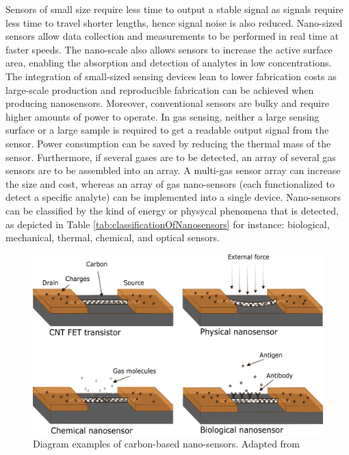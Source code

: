 Sensors of small size require less time to output a stable signal as signals require less time to travel shorter lengths, hence signal noise is also reduced. Nano-sized sensors allow data collection and measurements to be performed in real time at faster speeds. \cite{Khanna2016} The nano-scale also allows sensors to increase the active surface area, enabling the absorption and detection of analytes in low concentrations. \cite{Khanna2016} The integration of small-sized sensing devices lean to lower fabrication costs as large-scale production and reproducible fabrication can be achieved when producing nanosensors. \cite{Khanna2016} Moreover, conventional sensors are bulky and require higher amounts of power to operate. In gas sensing, neither a large sensing surface or a large sample is required to get a readable output signal from the sensor. Power consumption can be saved by reducing the thermal mass of the sensor. \cite{Khanna2016} Furthermore, if several gases are to be detected, an array of several gas sensors are to be assembled into an array. A multi-gas sensor array can increase the size and cost, whereas an array of gas nano-sensors (each functionalized to detect a specific analyte) can be implemented into a single device. \cite{Khanna2016} Nano-sensors can be classified by the kind of energy or physycal phenomena that is detected, as depicted in Table \ref{tab:classificationOfNanosensors} for instance: biological, mechanical, thermal, chemical, and optical sensors. \cite{Khanna2016, BaudritJ2017}

\begin{figure}[!th]
\centering
\includegraphics[scale=0.50]{./Figures/typesOfNanoSensors.png}
\decoRule
\caption[Types of Nano-sensors]{Diagram examples of carbon-based nano-sensors. Adapted from \cite{BaudritJ2017}}
\label{fig:diameterComparisonOfCarbonFibers}
\end{figure}

